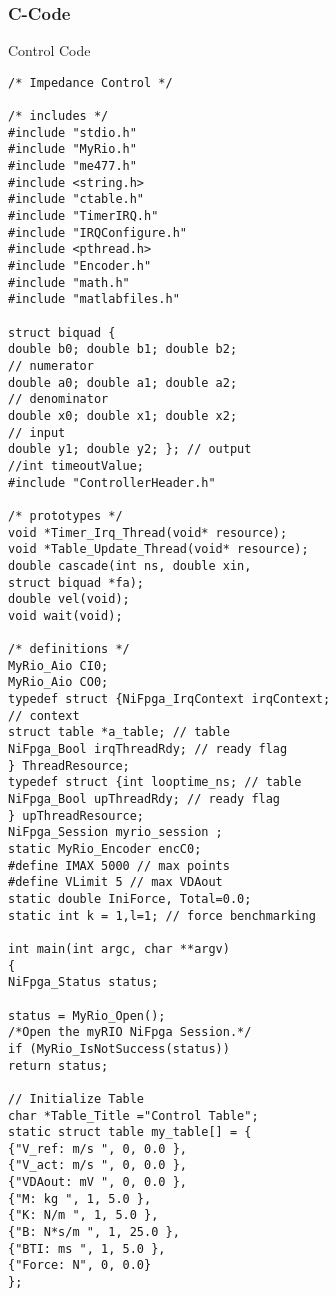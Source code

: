 \subsubsection*{C-Code}
\item{Control Code}
\begin{verbatim}
/* Impedance Control */

/* includes */
#include "stdio.h"
#include "MyRio.h"
#include "me477.h"
#include <string.h>
#include "ctable.h"
#include "TimerIRQ.h"
#include "IRQConfigure.h"
#include <pthread.h>
#include "Encoder.h"
#include "math.h"
#include "matlabfiles.h"

struct biquad {
double b0; double b1; double b2; 
// numerator
double a0; double a1; double a2; 
// denominator
double x0; double x1; double x2; 
// input
double y1; double y2; }; // output
//int timeoutValue;
#include "ControllerHeader.h"

/* prototypes */
void *Timer_Irq_Thread(void* resource);
void *Table_Update_Thread(void* resource);
double cascade(int ns, double xin, 
struct biquad *fa);
double vel(void);
void wait(void);

/* definitions */
MyRio_Aio CI0;
MyRio_Aio CO0;
typedef struct {NiFpga_IrqContext irqContext; 
// context
struct table *a_table; // table
NiFpga_Bool irqThreadRdy; // ready flag
} ThreadResource;
typedef struct {int looptime_ns; // table
NiFpga_Bool upThreadRdy; // ready flag
} upThreadResource;
NiFpga_Session myrio_session ;
static MyRio_Encoder encC0;
#define IMAX 5000 // max points
#define VLimit 5 // max VDAout
static double IniForce, Total=0.0;
static int k = 1,l=1; // force benchmarking

int main(int argc, char **argv)
{
NiFpga_Status status;

status = MyRio_Open();  	
/*Open the myRIO NiFpga Session.*/
if (MyRio_IsNotSuccess(status)) 
return status;

// Initialize Table
char *Table_Title ="Control Table";
static struct table my_table[] = {
{"V_ref: m/s ", 0, 0.0 },
{"V_act: m/s ", 0, 0.0 },
{"VDAout: mV ", 0, 0.0 },
{"M: kg ", 1, 5.0 },
{"K: N/m ", 1, 5.0 },
{"B: N*s/m ", 1, 25.0 },
{"BTI: ms ", 1, 5.0 },
{"Force: N", 0, 0.0}
};


\end{verbatim}
